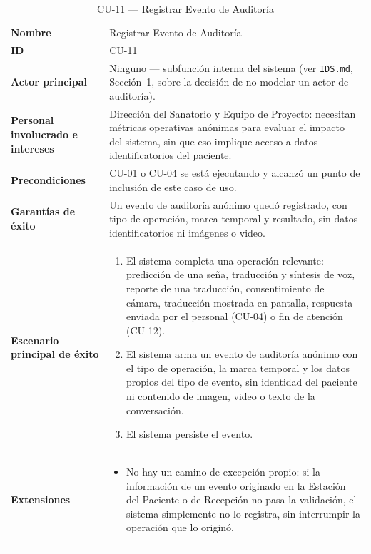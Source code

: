 \begin{longtable}{@{}>{\raggedright\arraybackslash}p{4.1cm} >{\raggedright\arraybackslash}p{\dimexpr\textwidth-4.1cm-2\tabcolsep\relax}@{}}
\caption{CU-11 --- Registrar Evento de Auditoría}\\
\toprule
\textbf{Nombre} & Registrar Evento de Auditoría \\
\textbf{ID} & CU-11 \\
\textbf{Actor principal} & Ninguno --- subfunción interna del sistema (ver \texttt{IDS.md}, Sección~1, sobre la decisión de no modelar un actor de auditoría). \\
\textbf{Personal involucrado e intereses} &
Dirección del Sanatorio y Equipo de Proyecto: necesitan métricas
operativas anónimas para evaluar el impacto del sistema, sin que eso
implique acceso a datos identificatorios del paciente. \\
\textbf{Precondiciones} &
CU-01 o CU-04 se está ejecutando y alcanzó un punto de inclusión de este
caso de uso. \\
\textbf{Garantías de éxito} &
Un evento de auditoría anónimo quedó registrado, con tipo de operación,
marca temporal y resultado, sin datos identificatorios ni imágenes o
video. \\
\textbf{Escenario principal de éxito} &
\begin{enumerate}[leftmargin=*, itemsep=2pt]
    \item El sistema completa una operación relevante: predicción de una
    seña, traducción y síntesis de voz, reporte de una traducción,
    consentimiento de cámara, traducción mostrada en pantalla, respuesta
    enviada por el personal (CU-04) o fin de atención (CU-12).
    \item El sistema arma un evento de auditoría anónimo con el tipo de
    operación, la marca temporal y los datos propios del tipo de evento,
    sin identidad del paciente ni contenido de imagen, video o texto de
    la conversación.
    \item El sistema persiste el evento.
\end{enumerate} \\
\textbf{Extensiones} &
\begin{itemize}[leftmargin=*, itemsep=2pt]
    \item[--] No hay un camino de excepción propio: si la información de
    un evento originado en la Estación del Paciente o de Recepción no
    pasa la validación, el sistema simplemente no lo registra, sin
    interrumpir la operación que lo originó.
\end{itemize} \\

\end{longtable}
